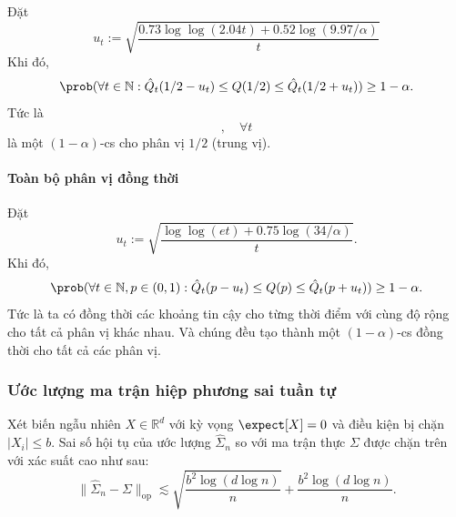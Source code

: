 \begin{exmp}
  Đặt \begin{equation}
    u_t := \sqrt{ \frac{ 0.73 \log\log(2.04t) + 0.52 \log(9.97/\alpha) } { t }
    }
  \end{equation} Khi đó, \begin{equation}
    \prob(\forall t \in \mathbb{N} : \hat{Q}_t(1/ 2 - u_t) \le Q(1/2) \le
    \hat{Q}_t(1/2 + u_t)) \ge 1 - \alpha.
  \end{equation} Tức là \begin{equation}
    [\hat{Q}_t(1/ 2 - u_t), \hat{Q}_t(1/2 + u_t))], \quad \forall t
  \end{equation} là một $(1 - \alpha)$-\gls{cs} cho phân vị $1/2$
(trung vị).
\end{exmp}


\paragraph{Toàn bộ phân vị đồng thời}

\begin{exmp}
  Đặt \begin{equation}
    u_t := \sqrt{ \frac{ \log\log(et) + 0.75 \log(34 / \alpha) } { t } }.
  \end{equation} Khi đó, \begin{equation}
    \prob(\forall t \in \mathbb{N}, p \in (0, 1): \hat{Q}_t(p - u_t) \le Q(p)
    \le \hat{Q}_t(p + u_t) ) \ge 1 - \alpha.
  \end{equation} Tức là ta có đồng thời các khoảng tin cậy cho từng thời điểm
  với cùng độ rộng cho tất cả phân vị khác nhau. Và chúng đều tạo thành một $(1
  - \alpha)$-\gls{cs} đồng thời cho tất cả các phân vị.
\end{exmp}

\subsubsection{Ước lượng ma trận hiệp phương sai tuần tự}

Xét biến ngẫu nhiên $X \in \mathbb{R}^d$ với kỳ vọng $\expect[X] = 0$ và điều
kiện bị chặn $|X_i| \le b$. Sai số hội tụ của ước lượng $\hat{\Sigma}_n$ so với
ma trận thực $\Sigma$ được chặn trên với xác suất cao như sau:
\begin{equation}
  \big\| \hat{\Sigma}_n - \Sigma \big\|_{\text{op}} \lesssim \sqrt{\frac{b^2
  \log(d \log n)}{n}} + \frac{b^2 \log(d \log n)}{n}.
\end{equation}

